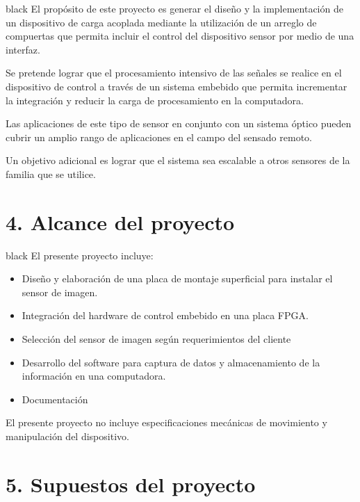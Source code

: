 \documentclass[
11pt, %
codirector, %
]{charter}
\begin{document}
\begin{consigna}{black}
El propósito de este proyecto es generar el diseño y la implementación de un dispositivo de carga acoplada mediante la utilización de un arreglo de compuertas que permita incluir el control del dispositivo sensor por medio de una interfaz. 

Se pretende lograr que el procesamiento intensivo de las señales se realice en el dispositivo de control a través de un sistema embebido que permita incrementar la integración y reducir la carga de procesamiento en la computadora. 

Las aplicaciones de este tipo de sensor en conjunto con un sistema óptico pueden cubrir un amplio rango de aplicaciones en el campo del sensado remoto.

Un objetivo adicional es lograr que el sistema sea escalable a otros sensores de la familia que se utilice.

\end{consigna}

\section{4. Alcance del proyecto}
\label{sec:alcance}

\begin{consigna}{black}
El presente proyecto incluye:

\begin{itemize}
	\item Diseño y elaboración de una placa de montaje superficial para instalar el sensor de imagen.
	\item Integración del hardware de control embebido en una placa FPGA.
	\item Selección del sensor de imagen según requerimientos del cliente
	\item Desarrollo del software para captura de datos y almacenamiento de la información en una computadora.
	\item Documentación

\end{itemize}

El presente proyecto no incluye especificaciones mecánicas de movimiento y manipulación del dispositivo.

\end{consigna}


\section{5. Supuestos del proyecto}
\label{sec:supuestos}
\end{document}
